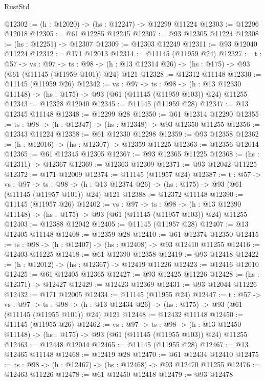 \begin{lexlean}{RustStd}
\begin{coremodule}
@12302 := (h : @12020) -> (hs : @12247) -> @12299 @11224
@12303 := @12296 @12018
@12305 := @61 @12285 @12245
@12307 := @93 @12305 @11224
@12308 := (hs : @12251) -> @12307
@12309 := @12303 @12249
@12311 := @93 @12040 @11224
@12312 := @171 @12013
@12314 := @11145 (@11959 @24)
@12327 := {t : @57} ->
  {vs : @97} ->
  {ts : @98} -> (h : @13 @12314 @26) -> (hs : @175) -> @93 (@61 (@11145 (@11959 @101)) @24) @121
@12328 := @12312 @11148
@12330 := @11145 (@11959 @26)
@12342 := {vs : @97} ->
  {ts : @98} ->
  (h : @13 @12330 @11148) -> (hs : @175) -> @93 (@61 (@11145 (@11959 @103)) @24) @11255
@12343 := @12328 @12040
@12345 := @11145 (@11959 @28)
@12347 := @13 @12345 @11148
@12348 := @12299 @28
@12350 := @61 @12314 @12290
@12355 := {ts : @98} -> (h : @12347) -> (hs : @12348) -> @93 @12350 @11255
@12356 := @12343 @11224
@12358 := @61 @12330 @12298
@12359 := @93 @12358
@12362 := (h : @12016) -> (hs : @12307) -> @12359 @11225
@12363 := @12356 @12014
@12365 := @61 @12345 @12305
@12367 := @93 @12365 @11225
@12368 := (hs : @12311) -> @12367
@12369 := @12363 @12309
@12371 := @93 @12042 @11225
@12372 := @171 @12009
@12374 := @11145 (@11957 @24)
@12387 := {t : @57} ->
  {vs : @97} ->
  {ts : @98} -> (h : @13 @12374 @26) -> (hs : @175) -> @93 (@61 (@11145 (@11957 @101)) @24) @121
@12388 := @12372 @11148
@12390 := @11145 (@11957 @26)
@12402 := {vs : @97} ->
  {ts : @98} ->
  (h : @13 @12390 @11148) -> (hs : @175) -> @93 (@61 (@11145 (@11957 @103)) @24) @11255
@12403 := @12388 @12042
@12405 := @11145 (@11957 @28)
@12407 := @13 @12405 @11148
@12408 := @12359 @28
@12410 := @61 @12374 @12350
@12415 := {ts : @98} -> (h : @12407) -> (hs : @12408) -> @93 @12410 @11255
@12416 := @12403 @11225
@12418 := @61 @12390 @12358
@12419 := @93 @12418
@12422 := (h : @12012) -> (hs : @12367) -> @12419 @11226
@12423 := @12416 @12010
@12425 := @61 @12405 @12365
@12427 := @93 @12425 @11226
@12428 := (hs : @12371) -> @12427
@12429 := @12423 @12369
@12431 := @93 @12044 @11226
@12432 := @171 @12005
@12434 := @11145 (@11955 @24)
@12447 := {t : @57} ->
  {vs : @97} ->
  {ts : @98} -> (h : @13 @12434 @26) -> (hs : @175) -> @93 (@61 (@11145 (@11955 @101)) @24) @121
@12448 := @12432 @11148
@12450 := @11145 (@11955 @26)
@12462 := {vs : @97} ->
  {ts : @98} ->
  (h : @13 @12450 @11148) -> (hs : @175) -> @93 (@61 (@11145 (@11955 @103)) @24) @11255
@12463 := @12448 @12044
@12465 := @11145 (@11955 @28)
@12467 := @13 @12465 @11148
@12468 := @12419 @28
@12470 := @61 @12434 @12410
@12475 := {ts : @98} -> (h : @12467) -> (hs : @12468) -> @93 @12470 @11255
@12476 := @12463 @11226
@12478 := @61 @12450 @12418
@12479 := @93 @12478

\end{coremodule}
\end{lexlean}
